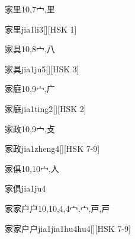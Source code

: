 \begin{Entry}{家里}{10,7}{⼧,⾥}
  \begin{Phonetics}{家里}{jia1li3}[][HSK 1]
  \end{Phonetics}
\end{Entry}

\begin{Entry}{家具}{10,8}{⼧,⼋}
  \begin{Phonetics}{家具}{jia1ju5}[][HSK 3]
  \end{Phonetics}
\end{Entry}

\begin{Entry}{家庭}{10,9}{⼧,⼴}
  \begin{Phonetics}{家庭}{jia1ting2}[][HSK 2]
  \end{Phonetics}
\end{Entry}

\begin{Entry}{家政}{10,9}{⼧,⽁}
  \begin{Phonetics}{家政}{jia1zheng4}[][HSK 7-9]
  \end{Phonetics}
\end{Entry}

\begin{Entry}{家俱}{10,10}{⼧,⼈}
  \begin{Phonetics}{家俱}{jia1ju4}
  \end{Phonetics}
\end{Entry}

\begin{Entry}{家家户户}{10,10,4,4}{⼧,⼧,⼾,⼾}
  \begin{Phonetics}{家家户户}{jia1jia1hu4hu4}[][HSK 7-9]
  \end{Phonetics}
\end{Entry}

